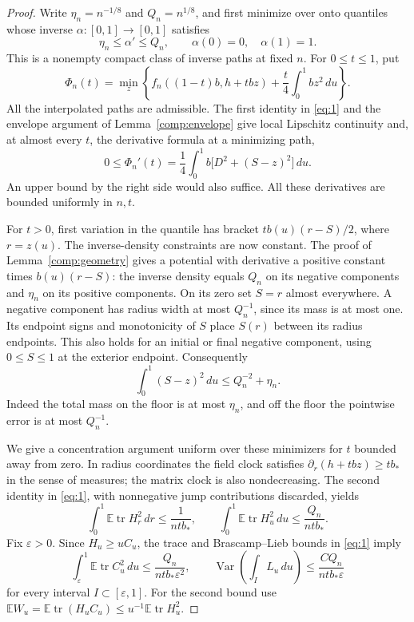 \begin{proof}
Write $\eta_n=n^{-1/8}$ and $Q_n=n^{1/8}$, and first minimize over
onto quantiles whose inverse $\alpha:[0,1]\to[0,1]$ satisfies
\[
 \eta_n\le\alpha'\le Q_n,\qquad \alpha(0)=0,\quad\alpha(1)=1.
\]
This is a nonempty compact class of inverse paths at fixed $n$.
For $0\le t\le1$, put
\[
 \Phi_n(t)=\min_z\left\{
 f_n((1-t)b,h+tbz)+\frac t4\int_0^1 bz^2\,du\right\}.
\]
All the interpolated paths are admissible. The first identity in
\eqref{eq:1} and the envelope argument of Lemma~\ref{comp:envelope}
give local Lipschitz continuity and, at almost every $t$, the
derivative formula at a minimizing path,
\[
 0\le\Phi_n'(t)=\frac14\int_0^1
                       b\bigl[D^2+(S-z)^2\bigr]\,du.
\]
An upper bound by the right side would also suffice. All these
derivatives are bounded uniformly in $n,t$.

For $t>0$, first variation in the quantile has bracket
$t b(u)(r-S)/2$, where $r=z(u)$. The inverse-density constraints
are now constant. The proof of Lemma~\ref{comp:geometry} gives a
potential with derivative a positive constant times $b(u)(r-S)$:
the inverse density equals $Q_n$ on its negative components and
$\eta_n$ on its positive components. On its zero set $S=r$
almost everywhere. A negative component has radius width at most
$Q_n^{-1}$, since its mass is at most one. Its endpoint signs and
monotonicity of $S$ place $S(r)$ between its radius endpoints. This
also holds for an initial or final negative component, using
$0\le S\le1$ at the exterior endpoint. Consequently
\[
 \int_0^1(S-z)^2\,du\le Q_n^{-2}+\eta_n.
\]
Indeed the total mass on the floor is at most $\eta_n$, and off the
floor the pointwise error is at most $Q_n^{-1}$.

We give a concentration argument uniform over these minimizers for
$t$ bounded away from zero. In radius coordinates the field clock
satisfies $\partial_r(h+tbz)\ge tb_*$ in the sense of measures;
the matrix clock is also nondecreasing. The second identity in
\eqref{eq:1}, with nonnegative jump contributions discarded, yields
\[
 \int_0^1\mathbb E\operatorname{tr}H_r^2\,dr
        \le\frac1{ntb_*},\qquad
 \int_0^1\mathbb E\operatorname{tr}H_u^2\,du
        \le\frac{Q_n}{ntb_*}.
\]
Fix $\varepsilon>0$. Since $H_u\ge uC_u$, the trace and
Brascamp--Lieb bounds in \eqref{eq:1} imply
\[
 \int_\varepsilon^1\mathbb E\operatorname{tr}C_u^2\,du
       \le\frac{Q_n}{ntb_*\varepsilon^2},\qquad
 \operatorname{Var}\left(\int_I L_u\,du\right)
       \le\frac{C Q_n}{ntb_*\varepsilon}
\]
for every interval $I\subset[\varepsilon,1]$. For the second bound
use $\mathbb E W_u=\mathbb E\operatorname{tr}(H_uC_u)
\le u^{-1}\mathbb E\operatorname{tr}H_u^2$.


\end{proof}
